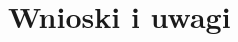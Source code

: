 \documentclass[12pt, eng, twoside, openany, final]{mgr}
\begin{document}
\chapter{Wnioski i uwagi}
\thispagestyle{fancy}
  \cite{CleanCode,EffectiveModern,RpiBeginner}




\end{document}

